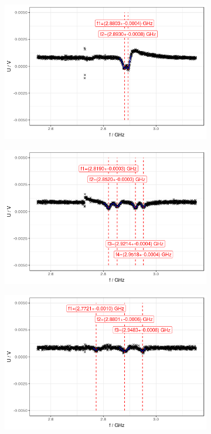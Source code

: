 \begin{figure}
	\begin{subfigure}{0.5\textwidth}
		\includegraphics[width=\textwidth]{../figures/odmr-bx.png}
	\end{subfigure}
	\begin{subfigure}{0.5\textwidth}
		\includegraphics[width=\textwidth]{../figures/odmr-by.png}
	\end{subfigure}
	\begin{subfigure}{0.5\textwidth}
		\includegraphics[width=\textwidth]{../figures/odmr-bz.png}

\end{subfigure}
\end{figure}
